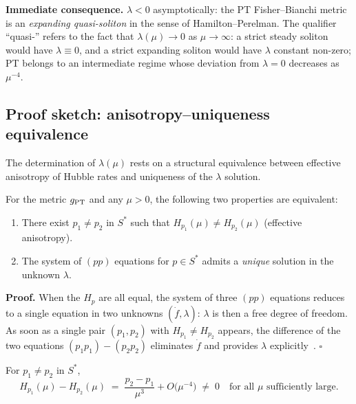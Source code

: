 \textbf{Immediate consequence.} $\lambda < 0$ asymptotically: the PT Fisher--Bianchi metric is an \emph{expanding quasi-soliton} in the sense of Hamilton--Perelman. The qualifier ``quasi-'' refers to the fact that $\lambda(\mu) \to 0$ as $\mu \to \infty$: a strict steady soliton would have $\lambda \equiv 0$, and a strict expanding soliton would have $\lambda$ constant non-zero; PT belongs to an intermediate regime whose deviation from $\lambda = 0$ decreases as $\mu^{-4}$.

\subsection{Proof sketch: anisotropy--uniqueness equivalence}
\label{sec:soliton:proof}

The determination of $\lambda(\mu)$ rests on a structural equivalence between effective anisotropy of Hubble rates and uniqueness of the $\lambda$ solution.

\begin{proposition}[Anisotropy \texorpdfstring{$\Leftrightarrow$}{<=>} uniqueness of $\lambda$]
\label{prop:anisotropy_en}
For the metric $g_{\rm PT}$ and any $\mu > 0$, the following two properties are equivalent:
\begin{enumerate}[nosep,label=\textup{(\roman*)}]
\item There exist $p_1 \neq p_2$ in $S^{*}$ such that $H_{p_1}(\mu) \neq H_{p_2}(\mu)$ (effective anisotropy).
\item The system of $(pp)$ equations for $p \in S^{*}$ admits a \emph{unique} solution in the unknown $\lambda$.
\end{enumerate}
\end{proposition}

\textbf{Proof.} When the $H_p$ are all equal, the system of three $(pp)$ equations reduces to a single equation in two unknowns $(\dot f, \lambda)$: $\lambda$ is then a free degree of freedom. As soon as a single pair $(p_1, p_2)$ with $H_{p_1} \neq H_{p_2}$ appears, the difference of the two equations $(p_1 p_1) - (p_2 p_2)$ eliminates $\dot f$ and provides $\lambda$ explicitly~\cite[\S 4]{PT_GeoFlow_RicciSoliton}. $\square$

\begin{lemme}
\label{lem:H_asymptotic_en}
For $p_1 \neq p_2$ in $S^{*}$,
\[
H_{p_1}(\mu) - H_{p_2}(\mu) \;=\; \dfrac{p_2 - p_1}{\mu^{3}} + O\!\bigl(\mu^{-4}\bigr) \;\neq\; 0
\quad\text{for all } \mu \text{ sufficiently large.}
\]
\end{lemme}

